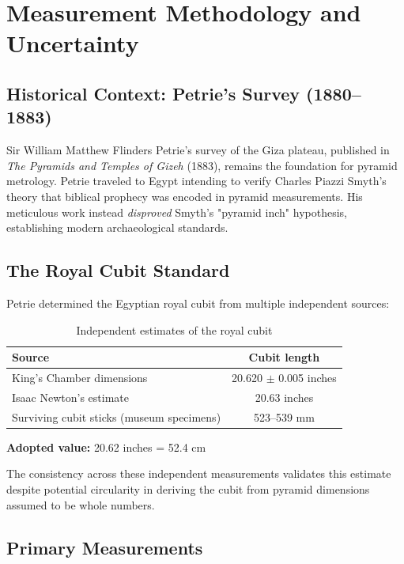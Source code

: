 \documentclass[11pt]{article}
\theoremstyle{definition}
\theoremstyle{remark}
\begin{document}
\section{Measurement Methodology and Uncertainty}

\subsection{Historical Context: Petrie's Survey (1880--1883)}

Sir William Matthew Flinders Petrie's survey of the Giza plateau, published in \emph{The Pyramids and Temples of Gizeh} (1883), remains the foundation for pyramid metrology. Petrie traveled to Egypt intending to verify Charles Piazzi Smyth's theory that biblical prophecy was encoded in pyramid measurements. His meticulous work instead \emph{disproved} Smyth's "pyramid inch" hypothesis, establishing modern archaeological standards.

\subsection{The Royal Cubit Standard}

Petrie determined the Egyptian royal cubit from multiple independent sources:

\begin{table}[h]
\centering
\begin{tabular}{@{}lc@{}}
\toprule
Source & Cubit length \\
\midrule
King's Chamber dimensions & 20.620 $\pm$ 0.005 inches \\
Isaac Newton's estimate & 20.63 inches \\
Surviving cubit sticks (museum specimens) & 523--539 mm \\
\bottomrule
\end{tabular}
\caption{Independent estimates of the royal cubit}
\end{table}

\textbf{Adopted value:} 20.62 inches = 52.4 cm

The consistency across these independent measurements validates this estimate despite potential circularity in deriving the cubit from pyramid dimensions assumed to be whole numbers.

\subsection{Primary Measurements}
\end{document}
